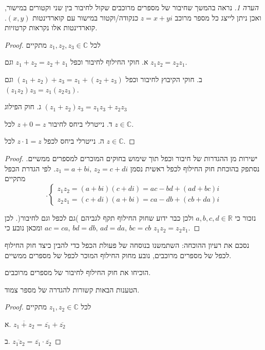 \documentclass[
  hebrew,
  12pt,
  a4paper,
  oneside]{book}
\theoremstyle{definition}
\theoremstyle{remark}
\theoremstyle{plain}
\theoremstyle{remark}
\newtheorem*{remark}{הערה}
\begin{document}
\begin{remark}
נראה בהמשך שחיבור של מספרים מרוכבים שקול לחיבור בין שני וקטורים במישור,
ואכן ניתן לייצג כל מספר מרוכב \(z=x+yi\) כנקודה/וקטור במישור עם
קוארדינטות \((x,y)\). קוארדינטות אלו נקראות קרטזיות.
\end{remark}

\begin{proof}
לכל \(z_{1},z_{2},z_{3}\in\mathbb{C}\) מתקיים

א. חוקי החילוף לחיבור וכפל \(z_{1}+z_{2}=z_{2}+z_{1}\) וגם
\(z_{1}z_{2}=z_{2}z_{1}\).

ב. חוקי הקיבוץ לחיבור וכפל \((z_{1}+z_{2})+z_{3}=z_{1}+(z_{2}+z_{3})\)
וגם \((z_{1}z_{2})z_{3}=z_{1}(z_{2}z_{3})\).

ג. חוק הפילוג \((z_{1}+z_{2})z_{3}=z_{1}z_{3}+z_{2}z_{3}\)

ד. נייטרלי ביחס לחיבור \(z+0=z\) לכל \(z\in\mathbb{C}\).

ה. נייטרלי ביחס לכפל \(z\cdot1=z\) לכל \(z\in\mathbb{C}\).
\end{proof}

\begin{proof}
ישירות מן ההגדרות של חיבור וכפל תוך שימוש בחוקים המוכרים למספרים ממשיים.
נסתפק בהוכחת חוק החילוף לכפל ראשית נסמן \(z_{1}=a+bi,\,z_{2}=c+di\). לפי
הגדרת הכפל מתקיים \[.\begin{cases}
z_{1}z_{2}=(a+bi)(c+di)=ac-bd+(ad+bc)i\\
z_{2}z_{1}=(c+di)(a+bi)=ca-db+(cb+da)i
\end{cases}\]

נזכור כי \(a,b,c,d\in\mathbb{R}\) ולכן כבר ידוע שחוק החילוף תקף לגביהם
)גם לכפל וגם לחיבור(. לכן \(ac=ca,\,bd=db,\,ad=da,\,bc=cb\) ומכאן נובע
כי \(z_{1}z_{2}=z_{2}z_{1}\).
\end{proof}

נסכם את רעיון ההוכחה: השתמשנו בנוסחה של פעולת הכפל כדי להבין כיצד חוק
החילוף לכפל של מספרים מרוכבים, נובע מחוק החילוף המוכר לכפל של מספרים
ממשיים.

\begin{exercise}

הוכיחו את חוק החילוף לחיבור של מספרים מרוכבים.

\end{exercise}

הטענות הבאות קשורות להגדרה של מספר צמוד.

\begin{proof}
לכל \(z_{1},z_{2}\in\mathbb{C}\) מתקיים

א. \(\overline{z_{1}+z_{2}}=\overline{z_{1}}+\overline{z_{2}}\)

ב. \(\overline{z_{1}z_{2}}=\overline{z_{1}}\cdot\overline{z_{2}}\)
\end{proof}
\end{document}
